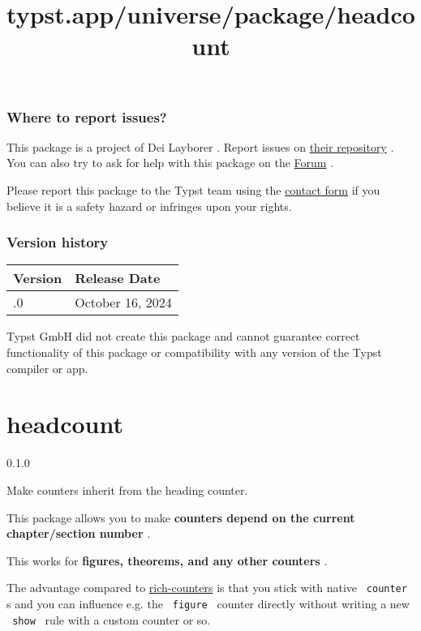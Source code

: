\subsubsection{Where to report issues?}\label{where-to-report-issues}

This package is a project of Dei Layborer . Report issues on
\href{https://github.com/dei-layborer/o-rly-typst}{their repository} .
You can also try to ask for help with this package on the
\href{https://forum.typst.app}{Forum} .

Please report this package to the Typst team using the
\href{https://typst.app/contact}{contact form} if you believe it is a
safety hazard or infringes upon your rights.

\label{versions}
\subsubsection{Version history}\label{version-history}

\begin{longtable}[]{@{}ll@{}}
\toprule\noalign{}
Version & Release Date \\
\midrule\noalign{}
\endhead
\bottomrule\noalign{}
\endlastfoot
0.1.0 & October 16, 2024 \\
\end{longtable}

Typst GmbH did not create this package and cannot guarantee correct
functionality of this package or compatibility with any version of the
Typst compiler or app.


\title{typst.app/universe/package/headcount}

\label{banner}
\section{headcount}\label{headcount}

{ 0.1.0 }

Make counters inherit from the heading counter.

\label{readme}
This package allows you to make \textbf{counters depend on the current
chapter/section number} .

This works for \textbf{figures, theorems, and any other counters} .

The advantage compared to
\href{https://typst.app/universe/package/rich-counters/}{rich-counters}
is that you stick with native \texttt{\ counter\ } s and you can
influence e.g. the \texttt{\ figure\ } counter directly without writing
a new \texttt{\ show\ } rule with a custom counter or so.

